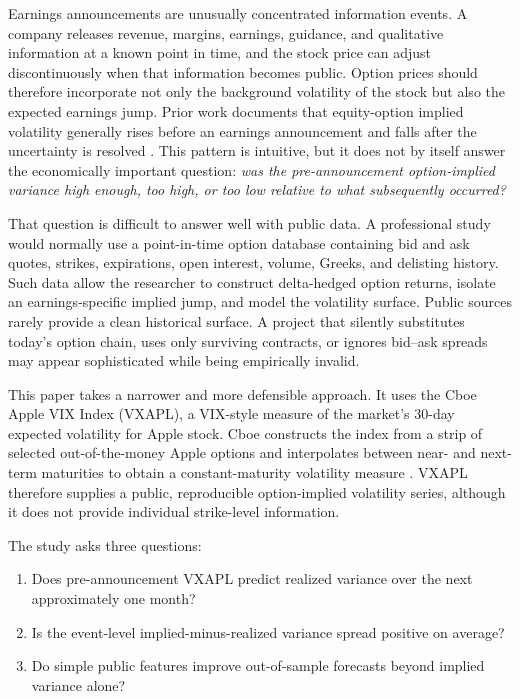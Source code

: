 \documentclass[11pt]{article}
\begin{document}
Earnings announcements are unusually concentrated information events. A company releases revenue, margins, earnings, guidance, and qualitative information at a known point in time, and the stock price can adjust discontinuously when that information becomes public. Option prices should therefore incorporate not only the background volatility of the stock but also the expected earnings jump. Prior work documents that equity-option implied volatility generally rises before an earnings announcement and falls after the uncertainty is resolved \citep{dubinsky2006earnings,gao2018straddles}. This pattern is intuitive, but it does not by itself answer the economically important question: \emph{was the pre-announcement option-implied variance high enough, too high, or too low relative to what subsequently occurred?}

That question is difficult to answer well with public data. A professional study would normally use a point-in-time option database containing bid and ask quotes, strikes, expirations, open interest, volume, Greeks, and delisting history. Such data allow the researcher to construct delta-hedged option returns, isolate an earnings-specific implied jump, and model the volatility surface. Public sources rarely provide a clean historical surface. A project that silently substitutes today's option chain, uses only surviving contracts, or ignores bid--ask spreads may appear sophisticated while being empirically invalid.

This paper takes a narrower and more defensible approach. It uses the Cboe Apple VIX Index (VXAPL), a VIX-style measure of the market's 30-day expected volatility for Apple stock. Cboe constructs the index from a strip of selected out-of-the-money Apple options and interpolates between near- and next-term maturities to obtain a constant-maturity volatility measure \citep{cboe2025methodology}. VXAPL therefore supplies a public, reproducible option-implied volatility series, although it does not provide individual strike-level information.

The study asks three questions:

\begin{enumerate}[leftmargin=1.5em]
    \item Does pre-announcement VXAPL predict realized variance over the next approximately one month?
    \item Is the event-level implied-minus-realized variance spread positive on average?
    \item Do simple public features improve out-of-sample forecasts beyond implied variance alone?
\end{enumerate}
\end{document}

